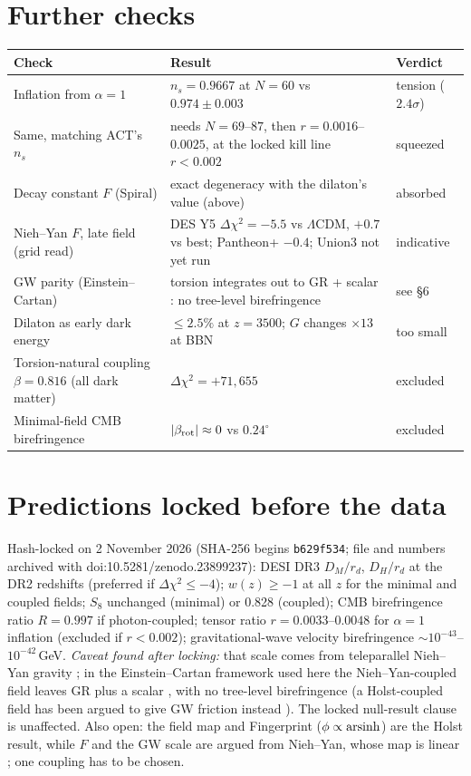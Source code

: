 \documentclass[11pt]{article}
\begin{document}
\section{Further checks}
\begin{center}\small
\begin{tabular}{p{}p{}p{}}
\toprule
Check & Result & Verdict\\
\midrule
Inflation from $\alpha=1$ & $n_s=0.9667$ at $N=60$ vs $0.974\pm0.003$ \cite{act2025} & tension ($2.4\sigma$)\\
Same, matching ACT's $n_s$ & needs $N=69$--$87$, then $r=0.0016$--$0.0025$, at the locked kill line $r<0.002$ & squeezed\\
Decay constant $F$ (Spiral) & exact degeneracy with the dilaton's value (above) & absorbed\\
Nieh--Yan $F$, late field (grid read) & DES Y5 $\Delta\chi^2=-5.5$ vs $\Lambda$CDM, $+0.7$ vs best; Pantheon+ $-0.4$; Union3 not yet run & indicative\\
GW parity (Einstein--Cartan) & torsion integrates out to GR + scalar \cite{calcagni2009}: no tree-level birefringence & see \S6\\
Dilaton as early dark energy & $\le2.5\%$ at $z=3500$; $G$ changes $\times13$ at BBN & too small\\
Torsion-natural coupling $\beta=0.816$ (all dark matter) & $\Delta\chi^2=+71{,}655$ & excluded\\
Minimal-field CMB birefringence & $|\beta_{\rm rot}|\approx0$ vs $0.24^\circ$ & excluded\\
\bottomrule
\end{tabular}
\end{center}

\section{Predictions locked before the data}
Hash-locked on 2 November 2026 (SHA-256 begins \texttt{b629f534}; file and numbers archived with
doi:10.5281/zenodo.23899237): DESI DR3 $D_M/r_d$, $D_H/r_d$ at the DR2 redshifts (preferred if $\Delta\chi^2\le-4$);
$w(z)\ge-1$ at all $z$ for the minimal and coupled fields; $S_8$ unchanged (minimal) or 0.828 (coupled); CMB
birefringence ratio $R=0.997$ if photon-coupled; tensor ratio $r=0.0033$--$0.0048$ for $\alpha=1$ inflation
(excluded if $r<0.002$); gravitational-wave velocity birefringence $\sim10^{-43}$--$10^{-42}$\,GeV. \emph{Caveat found after locking:} that scale comes
from teleparallel Nieh--Yan gravity \cite{lirao2020}; in the Einstein--Cartan framework used here the Nieh--Yan-coupled
field leaves GR plus a scalar \cite{calcagni2009}, with no tree-level birefringence (a Holst-coupled field has been argued to give GW friction instead \cite{gao2026}). The locked null-result clause is
unaffected. Also open: the field map and Fingerprint ($\phi\propto{\rm arsinh}$) are the Holst result, while $F$ and the
GW scale are argued from Nieh--Yan, whose map is linear \cite{calcagni2009}; one coupling has to be chosen.
\end{document}
